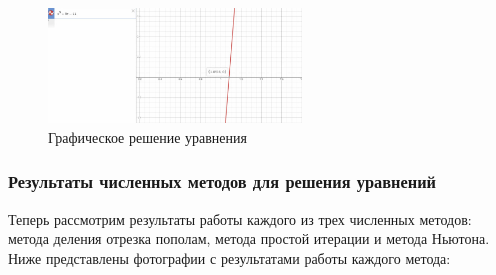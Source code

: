 \documentclass[12pt]{article}
\begin{document}
\begin{figure}[h]
  \centering
  \includegraphics[width=0.6\textwidth]{graph_equation.png}
  \caption{Графическое решение уравнения}
\end{figure}


\subsubsection{Результаты численных методов для решения уравнений}
Теперь рассмотрим результаты работы каждого из трех численных методов: метода деления отрезка пополам, метода простой итерации и метода Ньютона. Ниже представлены фотографии с результатами работы каждого метода:
\end{document}
